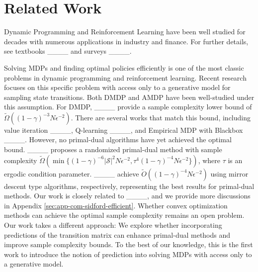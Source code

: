 \section{Related Work}

Dynamic Programming and Reinforcement Learning have been well studied for decades with numerous applications in industry and finance. For further details, see textbooks ____ and surveys ____.

Solving MDPs and finding optimal policies efficiently is one of the most classic problems in dynamic programming and reinforcement learning. 
Recent research focuses on this specific problem with access only to a generative model for sampling state transitions. Both DMDP and AMDP have been well-studied under this assumption. For DMDP, ____ provide a sample complexity lower bound of $\tilde{\Omega}((1-\gamma)^{-3} N \epsilon^{-2})$. There are several works that match this bound, including value iteration ____, Q-learning ____, and Empirical MDP with Blackbox ____.
However, no primal-dual algorithms have yet achieved the optimal bound. ____ proposes a randomized primal-dual method with sample complexity $\tilde{\Omega}(\min\{(1-\gamma)^{-6} |\mathcal{S}|^2N \epsilon^{-2},\tau^{4}(1-\gamma)^{-4} N \epsilon^{-2}\})$, where $\tau$ is an ergodic condition parameter. 
____ achieve $\tilde{O}((1-\gamma)^{-4} N \epsilon^{-2})$ using mirror descent type algorithms, respectively, representing the best results for primal-dual methods. Our work is closely related to ____, and we provide more discussions in Appendix \ref{sec:app-com-sidford-efficient}.
Whether convex optimization methods can achieve the optimal sample complexity remains an open problem.
Our work takes a different approach: We explore whether incorporating predictions of the transition matrix can enhance primal-dual methods and improve sample complexity bounds. To the best of our knowledge, this is the first work to introduce the notion of prediction into solving MDPs with access only to a generative model.


